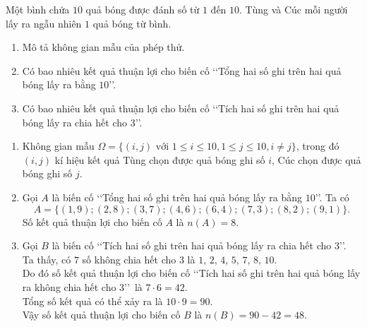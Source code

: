 \begin{bt}%
	Một bình chứa $10$ quả bóng được đánh số từ $1$ đến $10$. Tùng và Cúc mỗi người lấy ra ngẫu nhiên $1$ quả bóng từ bình.
	\begin{enumerate}
		\item Mô tả không gian mẫu của phép thử.
		\item Có bao nhiêu kết quả thuận lợi cho biến cố \lq\lq Tổng hai số ghi trên hai quả bóng lấy ra bằng $10$\rq\rq.
		\item Có bao nhiêu kết quả thuận lợi cho biến cố \lq\lq Tích hai số ghi trên hai quả bóng lấy ra chia hết cho $3$\rq\rq.
	\end{enumerate}
	\loigiai
	{
		\begin{enumerate}
			\item Không gian mẫu $\Omega= \{(i, j) \text{ với } 1\le i\le 10, 1\le j\le 10, i\neq j\}$, trong đó $(i, j)$ kí hiệu kết quả Tùng chọn được quả bóng ghi số $i$, Cúc chọn được quả bóng ghi số $j$.
			\item Gọi $A$ là biến cố \lq\lq Tổng hai số ghi trên hai quả bóng lấy ra bằng $10$\rq\rq. Ta có
			\[
			A=\{(1,9); (2,8); (3,7); (4,6); (6,4); (7,3); (8,2); (9,1)\}.
			\]
			Số kết quả thuận lợi cho biến cố $A$ là $n(A)=8$.
			\item Gọi $B$ là biến cố \lq\lq Tích hai số ghi trên hai quả bóng lấy ra chia hết cho $3$\rq\rq.\\
			Ta thấy, có $7$ số không chia hết cho $3$ là $1$, $2$, $4$, $5$, $7$, $8$, $10$.\\
			Do đó số kết quả thuận lợi cho biến cố \lq\lq Tích hai số ghi trên hai quả bóng lấy ra không chia hết cho $3$\rq\rq\ là $7\cdot 6=42$.\\
			Tổng số kết quả có thể xảy ra là $10\cdot 9=90$.\\
			Vậy số kết quả thuận lợi cho biến cố $B$ là $n(B)= 90-42=48$.
		\end{enumerate}
	}
\end{bt}

